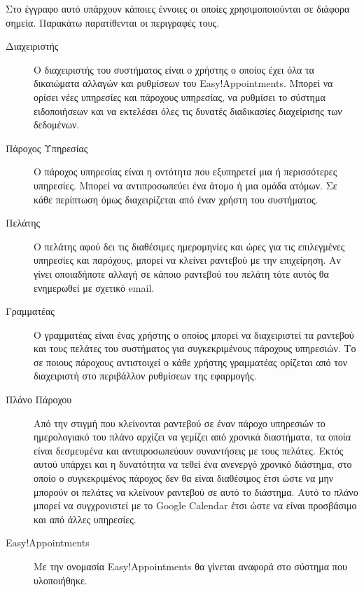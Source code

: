 \begin{Definitions}
Στο έγγραφο αυτό υπάρχουν κάποιες έννοιες οι οποίες χρησιμοποιούνται 
σε διάφορα σημεία. Παρακάτω παρατίθενται οι περιγραφές τους.
\begin{description}
\item [Διαχειριστής] Ο διαχειριστής του συστήματος είναι ο χρήστης ο οποίος έχει όλα τα δικαιώματα αλλαγών και ρυθμίσεων του Easy!Appointments. Μπορεί να ορίσει νέες υπηρεσίες και πάροχους υπηρεσίας, να ρυθμίσει το σύστημα ειδοποιήσεων και να εκτελέσει όλες τις δυνατές διαδικασίες διαχείρισης των δεδομένων.

\item [Πάροχος Υπηρεσίας] Ο πάροχος υπηρεσίας είναι η οντότητα που εξυπηρετεί μια ή περισσότερες υπηρεσίες. Μπορεί να αντιπροσωπεύει ένα άτομο ή μια ομάδα ατόμων. Σε κάθε περίπτωση όμως διαχειρίζεται από έναν χρήστη του συστήματος.

\item [Πελάτης] Ο πελάτης αφού δει τις διαθέσιμες ημερομηνίες και ώρες για τις επιλεγμένες υπηρεσίες και παρόχους, μπορεί να κλείνει ραντεβού με την επιχείρηση. Αν γίνει οποιαδήποτε αλλαγή σε κάποιο ραντεβού του πελάτη τότε αυτός θα ενημερωθεί με σχετικό email.

\item [Γραμματέας] Ο γραμματέας είναι ένας χρήστης ο οποίος μπορεί να διαχειριστεί τα ραντεβού και τους πελάτες του συστήματος για συγκεκριμένους πάροχους υπηρεσιών. Το σε ποιους πάροχους αντιστοιχεί ο κάθε χρήστης γραμματέας ορίζεται από τον διαχειριστή στο περιβάλλον ρυθμίσεων της εφαρμογής.

\item [Πλάνο Πάροχου] Από την στιγμή που κλείνονται ραντεβού σε έναν πάροχο υπηρεσιών το ημερολογιακό του πλάνο αρχίζει να γεμίζει από χρονικά διαστήματα, τα οποία είναι δεσμευμένα και αντιπροσωπεύουν συναντήσεις με τους πελάτες. Εκτός αυτού υπάρχει και η δυνατότητα να τεθεί ένα ανενεργό χρονικό διάστημα, στο οποίο ο συγκεκριμένος πάροχος δεν θα είναι διαθέσιμος έτσι ώστε να μην μπορούν οι πελάτες να κλείνουν ραντεβού σε αυτό το διάστημα. Αυτό το πλάνο μπορεί να συγχρονιστεί με το Google Calendar έτσι ώστε να είναι προσβάσιμο και από άλλες υπηρεσίες. 

\item [Easy!Appointments] Με την ονομασία Easy!Appointments θα γίνεται αναφορά στο σύστημα που υλοποιήθηκε.
\end{description}
\end{Definitions}


